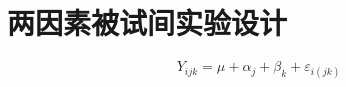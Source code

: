 \setchapterpreamble[u]{\margintoc}
\chapter{两因素被试间实验设计}

\[
Y_{ijk} = \mu + \alpha _j + \beta _k + \varepsilon _{i\left( jk \right)}
\]
